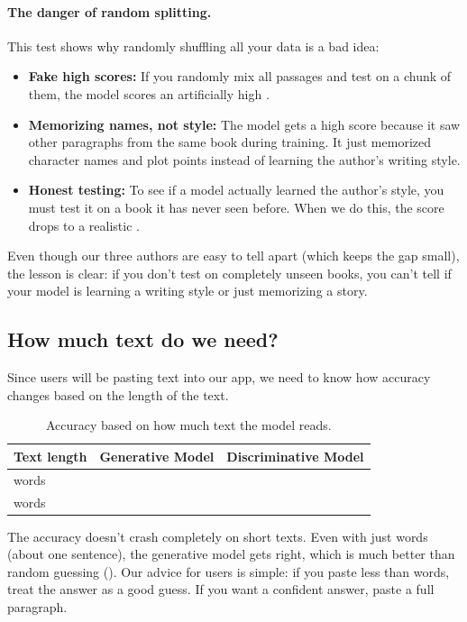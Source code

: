 \paragraph{The danger of random splitting.}
This test shows why randomly shuffling all your data is a bad idea:
\begin{itemize}
  \item \textbf{Fake high scores:} If you randomly mix all passages and test on a chunk of them, the model scores an artificially high \randomSplitAcc{}.
  \item \textbf{Memorizing names, not style:} The model gets a high score because it saw other paragraphs from the same book during training. It just memorized character names and plot points instead of learning the author's writing style.
  \item \textbf{Honest testing:} To see if a model actually learned the author's style, you must test it on a book it has never seen before. When we do this, the score drops to a realistic \workSplitAcc{}.
\end{itemize}

Even though our three authors are easy to tell apart (which keeps the \leakGap{} gap small), the lesson is clear: if you don't test on completely unseen books, you can't tell if your model is learning a writing style or just memorizing a story.

\subsection{How much text do we need?}

Since users will be pasting text into our app, we need to know how accuracy changes based on the length of the text.

\begin{table}[H]
\centering\small
\caption{Accuracy based on how much text the model reads.}
\begin{tabular}{lrr}
\toprule
\textbf{Text length} & \textbf{Generative Model} & \textbf{Discriminative Model} \\
\midrule
\lenShort{} words & \accShortGen{} & \accShortDisc{} \\
\lenLong{} words  & \accLongGen{}  & \accLongDisc{}  \\
\bottomrule
\end{tabular}
\end{table}

The accuracy doesn't crash completely on short texts. Even with just \lenShort{} words (about one sentence), the generative model gets \accShortGen{} right, which is much better than random guessing (\chanceAcc{}). Our advice for users is simple: if you paste less than \lenShort{} words, treat the answer as a good guess. If you want a confident answer, paste a full paragraph.

